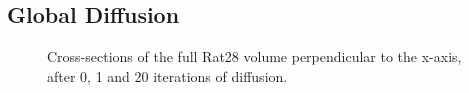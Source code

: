   \subsection{Global Diffusion} %
  \label{sub:global_diffusion}
    \begin{figure}[htbp]
      \centering
      \caption{Cross-sections of the full Rat28 volume perpendicular to the x-axis, after 0, 1 and 20 iterations of diffusion.}
      \label{fig:adjusted_0_235}
    \end{figure}

